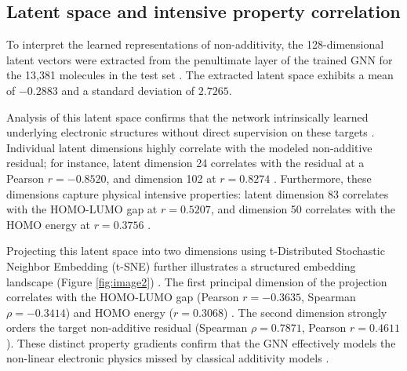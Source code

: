 \documentclass[]{article}
\begin{document}
\subsection{Latent space and intensive property correlation}

To interpret the learned representations of non-additivity, the 128-dimensional latent vectors were extracted from the penultimate layer of the trained GNN for the 13,381 molecules in the test set \citep{rittig2022graphneuralnetworksprediction,wang2023graphneuralnetworksmolecules,xing2025learningcontinuoussolventeffects}. The extracted latent space exhibits a mean of $-0.2883$ and a standard deviation of $2.7265$.

Analysis of this latent space confirms that the network intrinsically learned underlying electronic structures without direct supervision on these targets \citep{ye2019symmetricalgraphneuralnetwork,atlas2026latentspacedesigninteratomic}. Individual latent dimensions highly correlate with the modeled non-additive residual; for instance, latent dimension 24 correlates with the residual at a Pearson $r = -0.8520$, and dimension 102 at $r = 0.8274$ \citep{wu2019comprehensivesurveygraphneural}. Furthermore, these dimensions capture physical intensive properties: latent dimension 83 correlates with the HOMO-LUMO gap at $r = 0.5207$, and dimension 50 correlates with the HOMO energy at $r = 0.3756$ \citep{kosasih2021graphneuralnetworkensembles,schiff2022augmentingmoleculardeepgenerative,han2026multimodalmolecularrepresentationlearning}.

Projecting this latent space into two dimensions using t-Distributed Stochastic Neighbor Embedding (t-SNE) further illustrates a structured embedding landscape (Figure \ref{fig:image2}) \citep{liu2021fastquantumpropertyprediction,choi2022scalabletraininggraphconvolutional}. The first principal dimension of the projection correlates with the HOMO-LUMO gap (Pearson $r = -0.3635$, Spearman $\rho = -0.3414$) and HOMO energy ($r = 0.3068$) \citep{gilmer2017neuralmessagepassingquantum,zhang2021litegemlitegeometryenhanced}. The second dimension strongly orders the target non-additive residual (Spearman $\rho = 0.7871$, Pearson $r = 0.4611$). These distinct property gradients confirm that the GNN effectively models the non-linear electronic physics missed by classical additivity models \citep{ye2019symmetricalgraphneuralnetwork,kosasih2021graphneuralnetworkensembles}.
\end{document}
